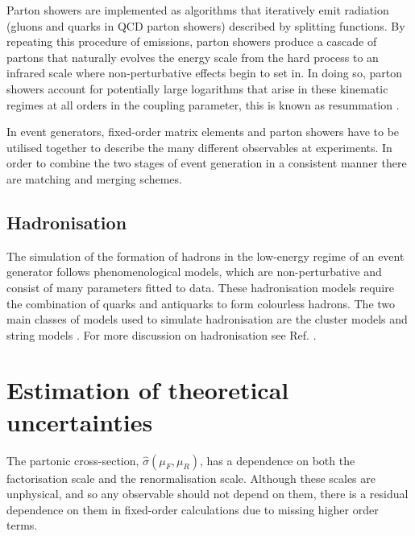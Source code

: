 \documentclass[main.tex]{subfiles}
\begin{document}
    Parton showers are implemented as algorithms that
    iteratively emit radiation (gluons and quarks in QCD
    parton showers) described by splitting functions.
    By repeating this procedure of emissions, parton
    showers produce a cascade of partons that naturally
    evolves the energy scale from the hard process to
    an infrared scale where non-perturbative effects
    begin to set in. In doing so, parton showers account
    for potentially large logarithms that arise in
    these kinematic regimes at all orders in the coupling
    parameter, this is known as resummation \cite{Buckley:2011ms}.

    In event generators, fixed-order matrix elements
    and parton showers have to be utilised together to describe
    the many different observables at experiments. In order
    to combine the two stages of event generation in a consistent
    manner there are matching \cite{Frixione:2002ik,Frixione:2007vw,Jadach:2015mza}
    and merging \cite{Catani:2001cc,Lonnblad:2011xx}
    schemes.

    \subsection*{Hadronisation}\label{sec:hadronisation}
    The simulation of the formation of hadrons in the low-energy regime
    of an event generator follows phenomenological models,
    which are non-perturbative and consist of many
    parameters fitted to data.
    These hadronisation models require the combination
    of quarks and antiquarks to form colourless hadrons.
    The two main classes of models used to simulate
    hadronisation are the cluster models \cite{Webber:1983if,Winter:2003tt}
    and string models \cite{Andersson:1983ia}.
    For more discussion on hadronisation
    see Ref. \cite{Webber:1999ui}.

    \section{Estimation of theoretical uncertainties}\label{sec:scale_variations}
    The partonic cross-section, $\hat{\sigma}(\mu_{F}, \mu_{R})$, has
    a dependence on both the factorisation scale and the
    renormalisation scale. Although these scales are unphysical,
    and so any observable should not depend on them,
    there is a residual dependence on them in fixed-order
    calculations due to missing higher order terms.
\end{document}
